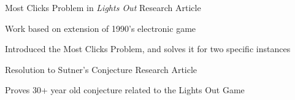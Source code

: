 \documentclass[a4paper]{awesome-cv}
\begin{document}
	\begin{cventries}
		\cvprojectentry
		{Most Clicks Problem in \textit{Lights Out}} %
		{Research Article} %
		{
			\begin{cvitems} %
				\item {Work based on extension of 1990's electronic game}
				\item {Introduced the Most Clicks Problem, and solves it for two specific instances}
			\end{cvitems}
		}
	
		\cvprojectentry
		{Resolution to Sutner's Conjecture} %
		{Research Article} %
		{
			\begin{cvitems} %
				\item {Proves 30+ year old conjecture related to the Lights Out Game}
			\end{cvitems}
		}
	\end{cventries}
	
	
\end{document}
